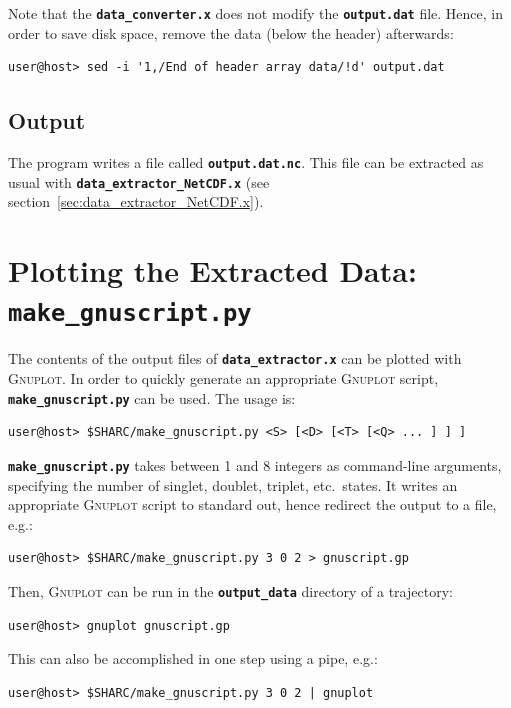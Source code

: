 \documentclass[a4paper,10pt,DIV=15,openany]{scrbook}
\newcommand{\ttt}[1]{\textbf{\texttt{#1}}}
\begin{document}
Note that the \ttt{data\_converter.x} does not modify the \ttt{output.dat} file.
Hence, in order to save disk space, remove the data (below the header) afterwards:
\begin{verbatim}
user@host> sed -i '1,/End of header array data/!d' output.dat
\end{verbatim}

\subsection{Output}

The program writes a file called \ttt{output.dat.nc}.
This file can be extracted as usual with \ttt{data\_extractor\_NetCDF.x} (see section~\ref{sec:data_extractor_NetCDF.x}).



\section{Plotting the Extracted Data: \ttt{make\_gnuscript.py}}\label{sec:make_gnuscript.py}

The contents of the output files of \ttt{data\_extractor.x} can be plotted with \textsc{Gnuplot}. In order to quickly generate an appropriate \textsc{Gnuplot} script, \ttt{make\_gnuscript.py} can be used. The usage is:
\begin{verbatim}
user@host> $SHARC/make_gnuscript.py <S> [<D> [<T> [<Q> ... ] ] ]
\end{verbatim}
\ttt{make\_gnuscript.py} takes between 1 and 8 integers as command-line arguments, specifying the number of singlet, doublet, triplet, etc.\ states. It writes an appropriate \textsc{Gnuplot} script to standard out, hence redirect the output to a file, e.g.:
\begin{verbatim}
user@host> $SHARC/make_gnuscript.py 3 0 2 > gnuscript.gp
\end{verbatim}


Then, \textsc{Gnuplot} can be run in the \ttt{output\_data} directory of a trajectory:
\begin{verbatim}
user@host> gnuplot gnuscript.gp
\end{verbatim}
This can also be accomplished in one step using a pipe, e.g.:
\begin{verbatim}
user@host> $SHARC/make_gnuscript.py 3 0 2 | gnuplot
\end{verbatim}
\end{document}
